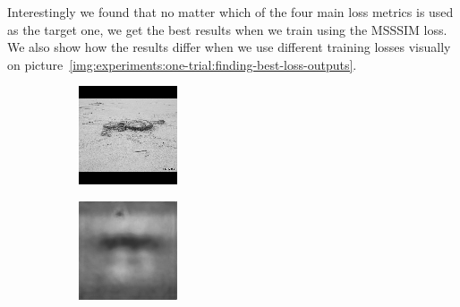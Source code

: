 Interestingly we found that no matter which of the four main loss metrics is used as the target one, we get the best results when we train using the MSSSIM loss. We also show how the results differ when we use different training losses visually on picture~\ref{img:experiments:one-trial:finding-best-loss-outputs}.

\begin{figure}[H]\centering
  \setcounter{subfigure}{0}
  \begin{subfigure}[t]{0.13\textwidth}
    \centering
    \includegraphics[width=\linewidth]{img/one-trial/stimulus_1.png}
  \end{subfigure}
  \begin{subfigure}[t]{0.13\textwidth}
    \centering
    \includegraphics[width=\linewidth]{img/one-trial/prediction_1_l1.png}

\end{subfigure}
\end{figure}

